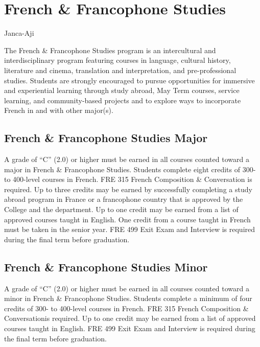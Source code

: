 \documentclass[
  letterpaper,
]{scrbook}
\begin{document}
\section{French \& Francophone
Studies}\label{sec-french-and-francophone-studies}

Janca-Aji

The French \& Francophone Studies program is an intercultural and
interdisciplinary program featuring courses in language, cultural
history, literature and cinema, translation and interpretation, and
pre-professional studies. Students are strongly encouraged to pursue
opportunities for immersive and experiential learning through study
abroad, May Term courses, service learning, and community-based projects
and to explore ways to incorporate French in and with other major(s).

\subsection{French \& Francophone Studies
Major}\label{french-francophone-studies-major}

A grade of ``C'' (2.0) or higher must be earned in all courses counted
toward a major in French \& Francophone Studies. Students complete eight
credits of 300- to 400-level courses in French. FRE 315 French
Composition \& Conversation is required. Up to three credits may be
earned by successfully completing a study abroad program in France or a
francophone country that is approved by the College and the department.
Up to one credit may be earned from a list of approved courses taught in
English. One credit from a course taught in French must be taken in the
senior year. FRE 499 Exit Exam and Interview is required during the
final term before graduation.

\subsection{French \& Francophone Studies
Minor}\label{french-francophone-studies-minor}

A grade of ``C'' (2.0) or higher must be earned in all courses counted
toward a minor in French \& Francophone Studies. Students complete a
minimum of four credits of 300- to 400-level courses in French. FRE 315
French Composition \& Conversationis required. Up to one credit may be
earned from a list of approved courses taught in English. FRE 499 Exit
Exam and Interview is required during the final term before graduation.
\end{document}
